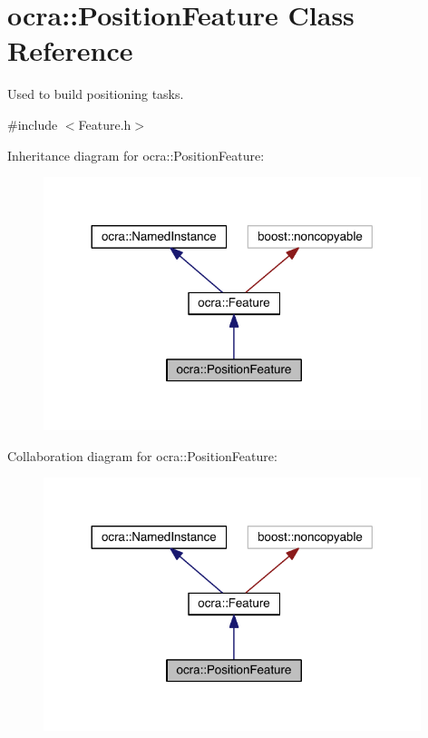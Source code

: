 \hypertarget{classocra_1_1PositionFeature}{}\section{ocra\+:\+:Position\+Feature Class Reference}
\label{classocra_1_1PositionFeature}


Used to build positioning tasks.  




{\ttfamily \#include $<$Feature.\+h$>$}



Inheritance diagram for ocra\+:\+:Position\+Feature\+:\nopagebreak
\begin{figure}[H]
\begin{center}
\leavevmode
\includegraphics[width=312pt]{da/dd9/classocra_1_1PositionFeature__inherit__graph}
\end{center}
\end{figure}


Collaboration diagram for ocra\+:\+:Position\+Feature\+:\nopagebreak
\begin{figure}[H]
\begin{center}
\leavevmode
\includegraphics[width=312pt]{db/d50/classocra_1_1PositionFeature__coll__graph}
\end{center}
\end{figure}
